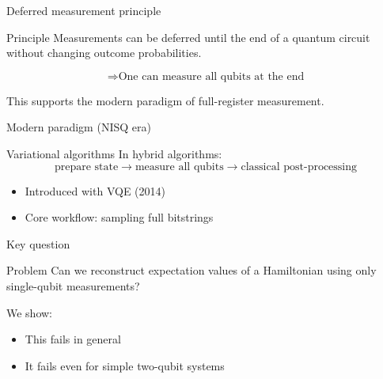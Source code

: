 \documentclass[aspectratio=169]{beamer}
\begin{document}

\begin{frame}{Deferred measurement principle}
\begin{block}{Principle}
Measurements can be deferred until the end of a quantum circuit without changing outcome probabilities.
\end{block}

\[
\Rightarrow \text{One can measure all qubits at the end}
\]

\medskip

This supports the modern paradigm of full-register measurement.
\end{frame}


\begin{frame}{Modern paradigm (NISQ era)}
\begin{block}{Variational algorithms}
In hybrid algorithms:
\[
\text{prepare state} \rightarrow \text{measure all qubits} \rightarrow \text{classical post-processing}
\]
\end{block}

\medskip

\begin{itemize}
\item Introduced with VQE (2014)
\item Core workflow: sampling full bitstrings
\end{itemize}

\end{frame}


\begin{frame}{Key question}
\begin{block}{Problem}
Can we reconstruct expectation values of a Hamiltonian using only single-qubit measurements?
\end{block}

\medskip

We show:
\begin{itemize}
\item This fails in general
\item It fails even for simple two-qubit systems
\end{itemize}
\end{frame}

\end{document}
